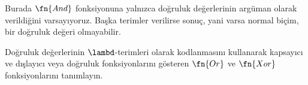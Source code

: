 \documentclass[../../../include/open-logic-section]{subfiles}
\begin{document}
Burada $\fn{And}$ fonksiyonuna yalnızca doğruluk değerlerinin argüman olarak
verildiğini varsayıyoruz. Başka terimler verilirse sonuç, yani varsa normal
biçim, bir doğruluk değeri olmayabilir.

\begin{prob}
  Doğruluk değerlerinin $\lambd$-terimleri olarak kodlanmasını kullanarak
  kapsayıcı ve dışlayıcı veya doğruluk fonksiyonlarını gösteren $\fn{Or}$ ve
  $\fn{Xor}$ fonksiyonlarını tanımlayın.
\end{prob}
\end{document}
